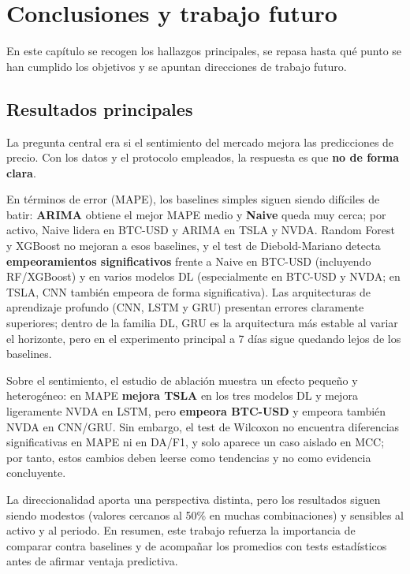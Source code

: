 \chapter{Conclusiones y trabajo futuro}
\label{ch:conclusion}

En este capítulo se recogen los hallazgos principales, se repasa hasta qué punto se han cumplido los objetivos y se apuntan direcciones de trabajo futuro.

\section{Resultados principales}

La pregunta central era si el sentimiento del mercado mejora las predicciones de precio. Con los datos y el protocolo empleados, la respuesta es que \textbf{no de forma clara}.

En términos de error (MAPE), los baselines simples siguen siendo difíciles de batir: \textbf{ARIMA} obtiene el mejor MAPE medio y \textbf{Naive} queda muy cerca; por activo, Naive lidera en BTC-USD y ARIMA en TSLA y NVDA. Random Forest y XGBoost no mejoran a esos baselines, y el test de Diebold-Mariano detecta \textbf{empeoramientos significativos} frente a Naive en BTC-USD (incluyendo RF/XGBoost) y en varios modelos DL (especialmente en BTC-USD y NVDA; en TSLA, CNN también empeora de forma significativa). Las arquitecturas de aprendizaje profundo (CNN, LSTM y GRU) presentan errores claramente superiores; dentro de la familia DL, GRU es la arquitectura más estable al variar el horizonte, pero en el experimento principal a 7 días sigue quedando lejos de los baselines.

Sobre el sentimiento, el estudio de ablación muestra un efecto pequeño y heterogéneo: en MAPE \textbf{mejora TSLA} en los tres modelos DL y mejora ligeramente NVDA en LSTM, pero \textbf{empeora BTC-USD} y empeora también NVDA en CNN/GRU. Sin embargo, el test de Wilcoxon no encuentra diferencias significativas en MAPE ni en DA/F1, y solo aparece un caso aislado en MCC; por tanto, estos cambios deben leerse como tendencias y no como evidencia concluyente.

La direccionalidad aporta una perspectiva distinta, pero los resultados siguen siendo modestos (valores cercanos al 50\% en muchas combinaciones) y sensibles al activo y al periodo. En resumen, este trabajo refuerza la importancia de comparar contra baselines y de acompañar los promedios con tests estadísticos antes de afirmar ventaja predictiva.

